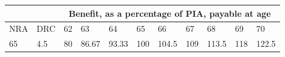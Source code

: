     \begin{tabular}{l|l|l l l l l l l l l} %
 \hline\hline
  &  & \multicolumn{9}{c}{Benefit, as a percentage of PIA, payable at age} \\ [0.5ex]
 \hline
NRA & DRC	& 62&63&64&65&66&67&68&69&70\\[0.5ex]
\hline
65  & 4.5  & 80 & 86.67&93.33&	100	&104.5&	109&	113.5 & 118&122.5\\
 \hline\hline
    \end{tabular}
